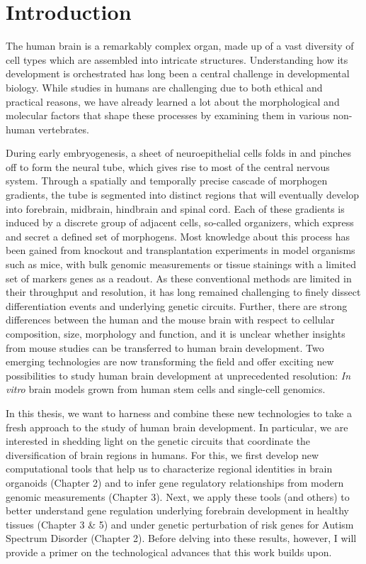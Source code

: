 \thispagestyle{plain}
\section{Introduction}




The human brain is a remarkably complex organ, made up of a vast diversity of cell types which are assembled into intricate structures. Understanding how its development is orchestrated has long been a central challenge in developmental biology. While studies in humans are challenging due to both ethical and practical reasons, we have already learned a lot about the morphological and molecular factors that shape these processes by examining them in various non-human vertebrates.

During early embryogenesis, a sheet of neuroepithelial cells folds in and pinches off to form the neural tube, which gives rise to most of the central nervous system. Through a spatially and temporally precise cascade of morphogen gradients, the tube is segmented into distinct regions that will eventually develop into forebrain, midbrain, hindbrain and spinal cord. Each of these gradients is induced by a discrete group of adjacent cells, so-called organizers, which express and secret a defined set of morphogens. Most knowledge about this process has been gained from knockout and transplantation experiments in model organisms such as mice, with bulk genomic measurements or tissue stainings with a limited set of markers genes as a readout. As these conventional methods are limited in their throughput and resolution, it has long remained challenging to finely dissect differentiation events and underlying genetic circuits. Further, there are strong differences between the human and the mouse brain with respect to cellular composition, size, morphology and function, and it is unclear whether insights from mouse studies can be transferred to human brain development. Two emerging technologies are now transforming the field and offer exciting new possibilities to study human brain development at unprecedented resolution: ​\textit{In vitro} brain models grown from human stem cells and single-cell genomics.

In this thesis, we want to harness and combine these new technologies to take a fresh approach to the study of human brain development. In particular, we are interested in shedding light on the genetic circuits that coordinate the diversification of brain regions in humans. For this, we first develop new computational tools that help us to characterize regional identities in brain organoids (Chapter 2) and to infer gene regulatory relationships from modern genomic measurements (Chapter 3). Next, we apply these tools (and others) to better understand gene regulation underlying forebrain development in healthy tissues (Chapter 3 \& 5) and under genetic perturbation of risk genes for Autism Spectrum Disorder (Chapter 2). Before delving into these results, however, I will provide a primer on the technological advances that this work builds upon.



